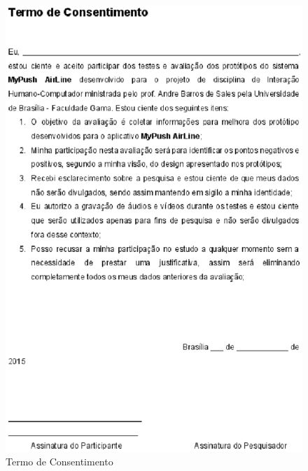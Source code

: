 \begin{apendicesenv}
\begin{figure}[h]
	\includegraphics[scale=0.5]{figuras/termo_consentimento.eps}
	\caption{Termo de Consentimento}
\end{figure}



\end{apendicesenv}
